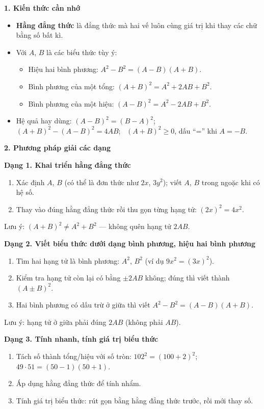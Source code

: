 \textbf{1. Kiến thức cần nhớ}
\begin{itemize}
\item \textbf{Hằng đẳng thức} là đẳng thức mà hai vế luôn cùng giá trị khi thay các chữ bằng số bất kì.
\item Với $A$, $B$ là các biểu thức tùy ý:
\begin{itemize}
\item Hiệu hai bình phương: $\boxed{A^2-B^2=(A-B)(A+B)}$.
\item Bình phương của một tổng: $\boxed{(A+B)^2=A^2+2AB+B^2}$.
\item Bình phương của một hiệu: $\boxed{(A-B)^2=A^2-2AB+B^2}$.
\end{itemize}
\item Hệ quả hay dùng: $(A-B)^2=(B-A)^2$; \ $(A+B)^2-(A-B)^2=4AB$; \ $(A+B)^2\ge 0$, dấu ``='' khi $A=-B$.
\end{itemize}

\textbf{2. Phương pháp giải các dạng}

\textbf{Dạng 1. Khai triển hằng đẳng thức}
\begin{enumerate}
\item Xác định $A$, $B$ (có thể là đơn thức như $2x$, $3y^2$); viết $A$, $B$ trong ngoặc khi có hệ số.
\item Thay vào đúng hằng đẳng thức rồi thu gọn từng hạng tử: $(2x)^2=4x^2$.
\end{enumerate}
Lưu ý: $(A+B)^2\ne A^2+B^2$ — không quên hạng tử $2AB$.

\textbf{Dạng 2. Viết biểu thức dưới dạng bình phương, hiệu hai bình phương}
\begin{enumerate}
\item Tìm hai hạng tử là bình phương: $A^2$, $B^2$ (ví dụ $9x^2=(3x)^2$).
\item Kiểm tra hạng tử còn lại có bằng $\pm 2AB$ không; đúng thì viết thành $(A\pm B)^2$.
\item Hai bình phương có dấu trừ ở giữa thì viết $A^2-B^2=(A-B)(A+B)$.
\end{enumerate}
Lưu ý: hạng tử ở giữa phải đúng $2AB$ (không phải $AB$).

\textbf{Dạng 3. Tính nhanh, tính giá trị biểu thức}
\begin{enumerate}
\item Tách số thành tổng/hiệu với số tròn: $102^2=(100+2)^2$; \ $49\cdot 51=(50-1)(50+1)$.
\item Áp dụng hằng đẳng thức để tính nhẩm.
\item Tính giá trị biểu thức: rút gọn bằng hằng đẳng thức trước, rồi mới thay số.
\end{enumerate}

